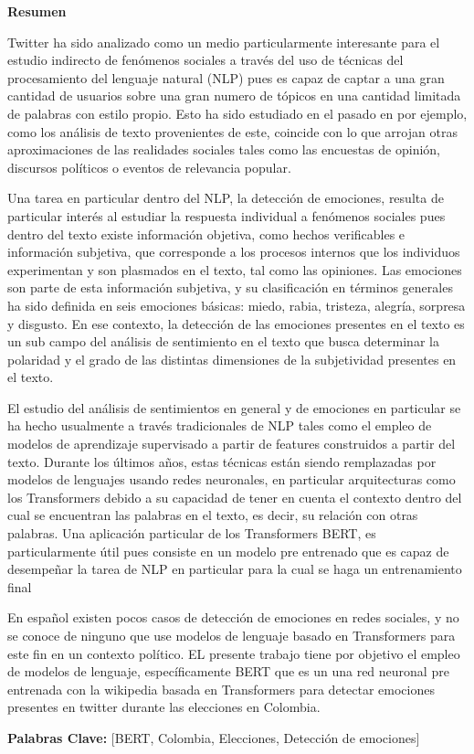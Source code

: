 \begin{center}
{\Large{\bf{Resumen}}}
\end{center}



Twitter ha sido analizado como un medio particularmente interesante para el estudio indirecto de fenómenos sociales a través del uso de técnicas del procesamiento del lenguaje natural (NLP) pues es capaz de captar a una gran cantidad de usuarios sobre una gran numero de tópicos en una cantidad limitada de palabras con estilo propio. Esto ha sido estudiado en el pasado en por ejemplo, como los análisis de texto provenientes de este, coincide con lo que arrojan otras aproximaciones de las realidades sociales tales como las encuestas de opinión, discursos políticos o eventos de relevancia popular. 

Una tarea en particular dentro del NLP,  la detección de emociones, resulta de particular interés al estudiar la respuesta individual a fenómenos sociales pues dentro del texto existe información objetiva, como hechos verificables e información subjetiva, que corresponde a los procesos internos que los individuos experimentan y son plasmados en el texto, tal como las opiniones. 
Las emociones son parte de esta información subjetiva, y su clasificación en términos generales ha sido definida en seis emociones básicas: miedo, rabia, tristeza, alegría, sorpresa y disgusto. En ese contexto, la detección de las emociones presentes en el texto es un sub campo del análisis de sentimiento en el texto que busca determinar la polaridad y el grado de las distintas dimensiones de la subjetividad presentes en el texto.


El estudio del análisis de sentimientos en general y de emociones en particular se ha hecho usualmente a través tradicionales de NLP tales como el empleo de modelos de aprendizaje supervisado a partir de features construidos a partir del texto.
Durante los últimos años, estas técnicas están siendo remplazadas por modelos de lenguajes usando redes neuronales, en particular arquitecturas como los Transformers debido a su capacidad de tener en cuenta el contexto dentro del cual se encuentran las palabras en el texto, es decir, su relación con otras palabras. Una aplicación particular de los Transformers BERT, es particularmente útil pues consiste en un modelo pre entrenado que es capaz de desempeñar la tarea de NLP en particular para la cual se haga un entrenamiento final

En español existen pocos casos de detección de emociones en redes sociales, y no se conoce de ninguno que use modelos de lenguaje basado en Transformers para este fin en un contexto político.
EL presente  trabajo tiene por objetivo el empleo de modelos de lenguaje, específicamente  BERT que es un una red neuronal pre entrenada con la wikipedia basada en Transformers para detectar emociones presentes en twitter durante las elecciones en Colombia.

\vspace{4cm} %
\textbf{Palabras Clave:} [BERT, Colombia, Elecciones, Detección de emociones]

\clearpage